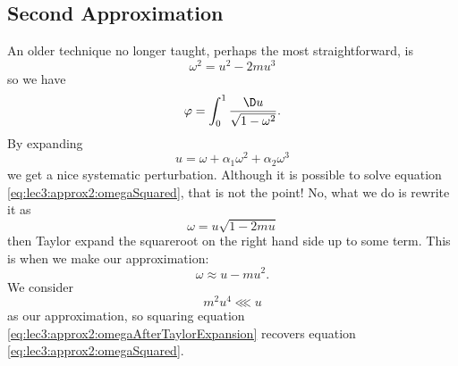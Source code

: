 \subsection{Second Approximation}
An older technique no longer taught, perhaps the most
straightforward, is
\begin{equation}\label{eq:lec3:approx2:omegaSquared}
\omega^{2}=u^{2}-2mu^{3}
\end{equation}
so we have
\begin{equation}
\varphi=\int^{1}_{0}\frac{\D u}{\sqrt{1-\omega^{2}}}.
\end{equation}
By expanding
\begin{equation}
u=\omega+\alpha_{1}\omega^{2}+\alpha_{2}\omega^{3}
\end{equation}
we get a nice systematic perturbation. Although it is possible to
solve equation \eqref{eq:lec3:approx2:omegaSquared}, that is not
the point! No, what we do is rewrite it as
\begin{equation}
\omega=u\sqrt{1-2mu}
\end{equation}
then Taylor expand the squareroot on the right hand side up to
some term. This is when we make our approximation:
\begin{equation}\label{eq:lec3:approx2:omegaAfterTaylorExpansion}
\omega\approx u-mu^{2}.
\end{equation}
We consider
\begin{equation}
m^{2}u^{4}\lll u
\end{equation}
as our approximation, so squaring equation
\eqref{eq:lec3:approx2:omegaAfterTaylorExpansion} recovers equation \eqref{eq:lec3:approx2:omegaSquared}.


